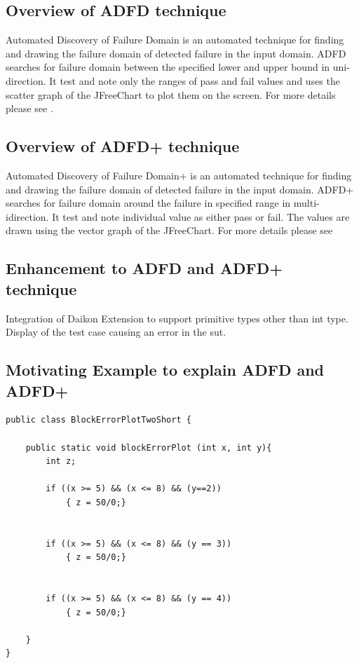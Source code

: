 \documentclass[runningheads,a4paper]{llncs}
\begin{document}
\subsection{Overview of ADFD technique}
Automated Discovery of Failure Domain is an automated technique for finding and drawing the failure domain of detected failure in the input domain. ADFD searches for failure domain between the specified lower and upper bound in uni-direction. It test and note only the ranges of pass and fail values and uses the scatter graph of the JFreeChart to plot them on the screen. For more details please see \cite{}.

\subsection{Overview of ADFD+ technique}
Automated Discovery of Failure Domain+ is an automated technique for finding and drawing the failure domain of detected failure in the input domain. ADFD+ searches for failure domain around the failure in specified range in multi-idirection. It test and note individual value as either pass or fail. The values are drawn using the vector graph of the JFreeChart. For more details please see \cite{}


\subsection{Enhancement to ADFD and ADFD+ technique}

Integration of Daikon
Extension to support primitive types other than int type.
Display of the test case causing an error in the sut.


\subsection{Motivating Example to explain ADFD and ADFD+}

\begin{lstlisting}
public class BlockErrorPlotTwoShort {

	public static void blockErrorPlot (int x, int y){
		int z;

		if ((x >= 5) && (x <= 8) && (y==2))
			{ z = 50/0;}


		if ((x >= 5) && (x <= 8) && (y == 3))
			{ z = 50/0;}


		if ((x >= 5) && (x <= 8) && (y == 4))
			{ z = 50/0;}

	}
}
\end{lstlisting}
\end{document}
